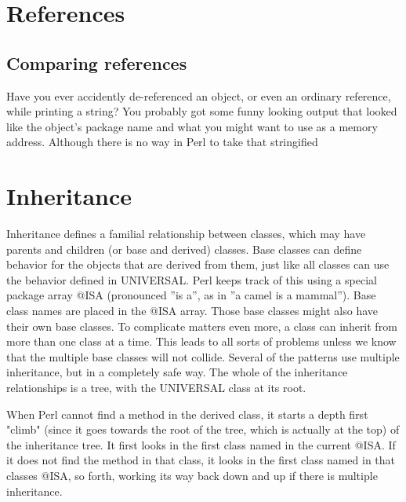 

     \section{References}
     
     
     \subsection{Comparing references}

Have you ever accidently de-referenced an object, or even an ordinary
reference, while printing a string?  You probably got some funny looking
output that looked like the object's package name and what you might
want to use as a memory address.  Although there is no way in Perl to
take that stringified      

    \section{Inheritance}

Inheritance defines a familial relationship between classes, which may
have parents and children (or base and derived) classes.  Base classes
can define behavior for the objects that are derived from them, just
like all classes can use the behavior defined in UNIVERSAL.  Perl keeps
track of this using a special package array @ISA (pronounced ''is a'', as
in ''a camel is a mammal'').  Base class names are placed in the @ISA array.
Those base classes might also have their own base classes.  To complicate
matters even more, a class can inherit from more than one class at a time.
This leads to all sorts of problems unless we know that the multiple base
classes will not collide.  Several of the patterns use multiple inheritance,
but in a completely safe way.  The whole of the inheritance relationships
is a tree, with the UNIVERSAL class at its root.


When Perl cannot find a method in the derived class, it starts a depth first
"climb" (since it goes towards the root of the tree, which is actually
at the top) of the inheritance tree.  It first looks in the first class named 
in the current @ISA.  If it does not find the method in that class, it looks
in the first class named in that classes @ISA, so forth, working its way
back down and up if there is multiple inheritance.


